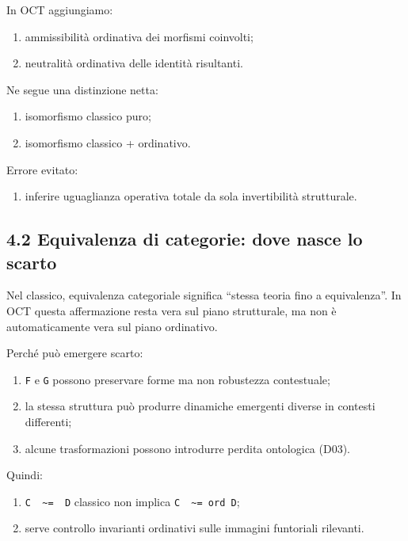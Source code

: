 In OCT aggiungiamo:

\begin{enumerate}
\def\labelenumi{\arabic{enumi}.}
\tightlist
\item
  ammissibilità ordinativa dei morfismi coinvolti;
\item
  neutralità ordinativa delle identità risultanti.
\end{enumerate}

Ne segue una distinzione netta:

\begin{enumerate}
\def\labelenumi{\arabic{enumi}.}
\tightlist
\item
  isomorfismo classico puro;
\item
  isomorfismo classico + ordinativo.
\end{enumerate}

Errore evitato:

\begin{enumerate}
\def\labelenumi{\arabic{enumi}.}
\tightlist
\item
  inferire uguaglianza operativa totale da sola invertibilità strutturale.
\end{enumerate}

\subsection{4.2 Equivalenza di categorie: dove nasce lo scarto}

Nel classico, equivalenza categoriale significa ``stessa teoria fino a equivalenza''. In OCT questa affermazione resta vera sul piano strutturale, ma non è automaticamente vera sul piano ordinativo.

Perché può emergere scarto:

\begin{enumerate}
\def\labelenumi{\arabic{enumi}.}
\tightlist
\item
  \texttt{F} e \texttt{G} possono preservare forme ma non robustezza contestuale;
\item
  la stessa struttura può produrre dinamiche emergenti diverse in contesti differenti;
\item
  alcune trasformazioni possono introdurre perdita ontologica (D03).
\end{enumerate}

Quindi:

\begin{enumerate}
\def\labelenumi{\arabic{enumi}.}
\tightlist
\item
  \texttt{C\ \ \textasciitilde{}=\ \ D} classico non implica \texttt{C\ \ \textasciitilde{}=\ ord\ D};
\item
  serve controllo invarianti ordinativi sulle immagini funtoriali rilevanti.
\end{enumerate}

